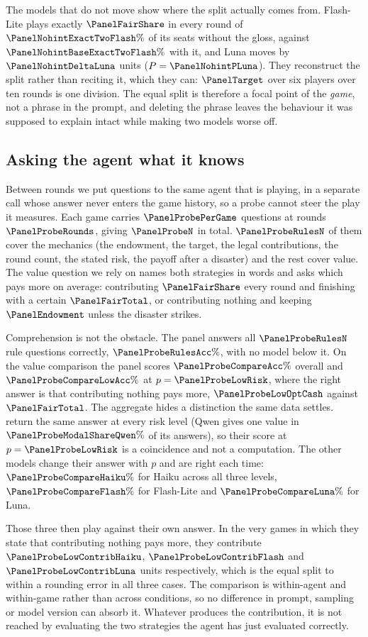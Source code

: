 The models that do not move show where the split actually comes from.
Flash-Lite plays exactly $\PanelFairShare$ in every round of
$\PanelNohintExactTwoFlash\%$ of its seats without the gloss, against
$\PanelNohintBaseExactTwoFlash\%$ with it, and Luna moves by
$\PanelNohintDeltaLuna$ units ($P=\PanelNohintPLuna$). They reconstruct the split rather
than reciting it, which they can: $\PanelTarget$ over six players over ten rounds is one
division. The equal split is therefore a focal point of the \emph{game}, not a phrase in
the prompt, and deleting the phrase leaves the behaviour it was supposed to explain intact
while making two models worse off.

\subsection{Asking the agent what it knows}
\label{sec:evprobe}

Between rounds we put questions to the same agent that is playing, in a separate call whose
answer never enters the game history, so a probe cannot steer the play it measures. Each
game carries $\PanelProbePerGame$ questions at rounds $\PanelProbeRounds$, giving
$\PanelProbeN$ in total. $\PanelProbeRulesN$ of them cover the mechanics (the endowment,
the target, the legal contributions, the round count, the stated risk, the payoff after a
disaster) and the rest cover value. The value question we rely on names both strategies in words and
asks which pays more on average: contributing $\PanelFairShare$ every round and finishing
with a certain $\PanelFairTotal$, or contributing nothing and keeping $\PanelEndowment$
unless the disaster strikes.

Comprehension is not the obstacle. The panel answers all $\PanelProbeRulesN$ rule
questions correctly, $\PanelProbeRulesAcc\%$, with no model below it. On the value
comparison the panel scores $\PanelProbeCompareAcc\%$ overall and
$\PanelProbeCompareLowAcc\%$ at $p=\PanelProbeLowRisk$, where the right answer is that
contributing nothing pays more, $\PanelProbeLowOptCash$ against $\PanelFairTotal$. The
aggregate hides a distinction the same data settles. \PanelProbeConstantModels{} return the
same answer at every risk level (Qwen gives one value in
$\PanelProbeModalShareQwen\%$ of its answers), so their score at
$p=\PanelProbeLowRisk$ is a coincidence and not a computation. The other
\PanelProbeCompareLowPerfectWord{} models change their
answer with $p$ and are right each time: $\PanelProbeCompareHaiku\%$ for
Haiku across all three levels, $\PanelProbeCompareFlash\%$ for
Flash-Lite and $\PanelProbeCompareLuna\%$ for Luna.

Those three then play against their own answer. In the very games in which they state that
contributing nothing pays more, they contribute $\PanelProbeLowContribHaiku$,
$\PanelProbeLowContribFlash$ and $\PanelProbeLowContribLuna$ units respectively, which is
the equal split to within a rounding error in all three cases. The comparison is
within-agent and within-game rather than across conditions, so no difference in prompt,
sampling or model version can absorb it. Whatever produces the contribution, it is not
reached by evaluating the two strategies the agent has just evaluated correctly.
